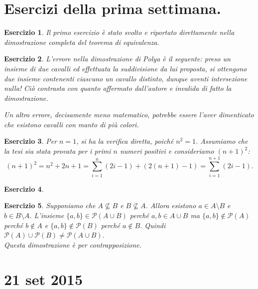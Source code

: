 \documentclass[fontsize = 11 pt, paper=A4, oneside, index=totoc, hyperref]{article}
\theoremstyle{definition}
\theoremstyle{plain}
\newtheorem{exe}{Esercizio}[section]
\begin{document}
\section{Esercizi della prima settimana.}
\begin{exe}
  Il primo esercizio è stato svolto e riportato direttamente nella dimostrazione completa del teorema di equivalenza.
\end{exe}
\begin{exe}
  L'errore nella dimostrazione di Polya è il seguente: preso un insieme di due cavalli ed effettuata la suddivisione da lui proposta, si ottengono due insieme contenenti ciascuno un cavallo distinto, dunque aventi intersezione nulla! Ciò contrasta con quanto affermato dall'autore e invalida di fatto la dimostrazione.

  Un altro errore, decisamente meno matematico, potrebbe essere l'aver dimenticato che esistono cavalli con manto di più colori.
\end{exe}
\begin{exe}
  Per \(n = 1\), si ha la verifica diretta, poiché \(n^2 = 1\). Assumiamo che la tesi sia stata provata per i primi \(n\) numeri positivi e consideriamo \((n+1)^2\):
  \begin{equation}
    (n+1)^2 = n^2 + 2n + 1 = \sum_{i=1}^n (2i - 1) + (2(n + 1) - 1) = \sum_{i = 1}^{n+1}(2i - 1).
  \end{equation}
\end{exe}
\begin{exe}
\end{exe}

\begin{exe}
Supponiamo che $A \not\subseteq B$ e $B \not\subseteq A$. Allora esistono $a \in A\setminus B$ e $b\in B\setminus A$. L'insieme $\{ a,b\} \in \mathcal{P} (A\cup B)$ perché $a,b\in A\cup B$ ma $\{ a,b\} \not\in \mathcal{P} (A)$ perché $b \not\in A$ e $\{ a,b\} \not\in \mathcal{P} (B)$ perché $a \not\in B$. Quindi $\mathcal{P} (A) \cup \mathcal{P} (B) \not = \mathcal{P} (A\cup B)$. \\
Questa dimostrazione è per contrapposizione.
\end{exe}

\section{21 set 2015}
\end{document}
